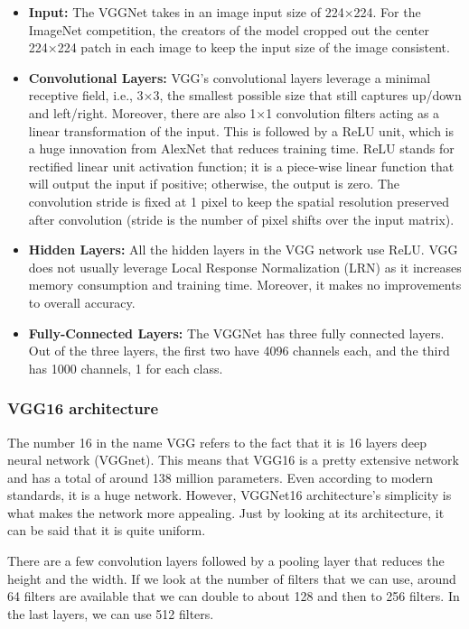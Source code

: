 \begin{itemize}
    \item \textbf{Input:} The VGGNet takes in an image input size of 224×224. For the ImageNet competition, the creators of the model cropped out the center 224×224 patch in each image to keep the input size of the image consistent.
    \item \textbf{Convolutional Layers:} VGG’s convolutional layers leverage a minimal receptive field, i.e., 3×3, the smallest possible size that still captures up/down and left/right. Moreover, there are also 1×1 convolution filters acting as a linear transformation of the input. This is followed by a ReLU unit, which is a huge innovation from AlexNet that reduces training time. ReLU stands for rectified linear unit activation function; it is a piece-wise linear function that will output the input if positive; otherwise, the output is zero. The convolution stride is fixed at 1 pixel to keep the spatial resolution preserved after convolution (stride is the number of pixel shifts over the input matrix).
    \item \textbf{Hidden Layers:} All the hidden layers in the VGG network use ReLU. VGG does not usually leverage Local Response Normalization (LRN) as it increases memory consumption and training time. Moreover, it makes no improvements to overall accuracy.
    \item \textbf{Fully-Connected Layers:} The VGGNet has three fully connected layers. Out of the three layers, the first two have 4096 channels each, and the third has 1000 channels, 1 for each class.
\end{itemize}

\subsubsection{VGG16 architecture}
\hspace{\parindent}
The number 16 in the name VGG refers to the fact that it is 16 layers deep neural network (VGGnet). This means that VGG16 is a pretty extensive network and has a total of around 138 million parameters. Even according to modern standards, it is a huge network. However, VGGNet16 architecture’s simplicity is what makes the network more appealing. Just by looking at its architecture, it can be said that it is quite uniform.

There are a few convolution layers followed by a pooling layer that reduces the height and the width. If we look at the number of filters that we can use, around 64 filters are available that we can double to about 128 and then to 256 filters. In the last layers, we can use 512 filters.

